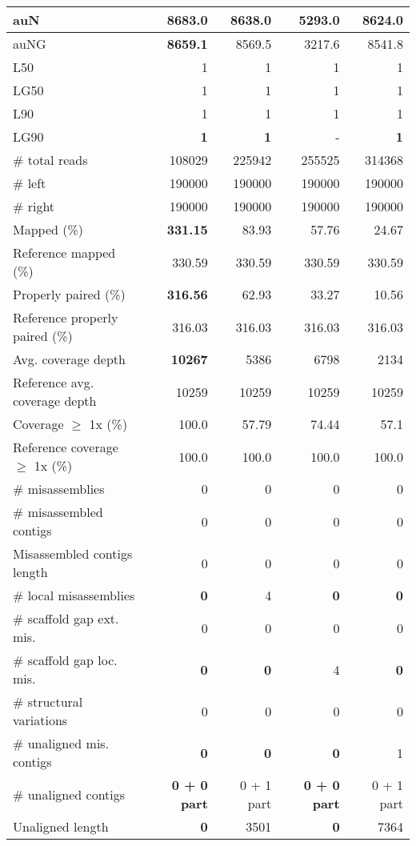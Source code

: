 \documentclass[12pt,a4paper]{article}
\begin{document}
\begin{table}[ht]
\begin{center}
\begin{tabular}{|l*{4}{|r}|}
auN & {\bf 8683.0} & 8638.0 & 5293.0 & 8624.0 \\ \hline
auNG & {\bf 8659.1} & 8569.5 & 3217.6 & 8541.8 \\ \hline
L50 & 1 & 1 & 1 & 1 \\ \hline
LG50 & 1 & 1 & 1 & 1 \\ \hline
L90 & 1 & 1 & 1 & 1 \\ \hline
LG90 & {\bf 1} & {\bf 1} & - & {\bf 1} \\ \hline
\# total reads & 108029 & 225942 & 255525 & 314368 \\ \hline
\# left & 190000 & 190000 & 190000 & 190000 \\ \hline
\# right & 190000 & 190000 & 190000 & 190000 \\ \hline
Mapped (\%) & {\bf 331.15} & 83.93 & 57.76 & 24.67 \\ \hline
Reference mapped (\%) & 330.59 & 330.59 & 330.59 & 330.59 \\ \hline
Properly paired (\%) & {\bf 316.56} & 62.93 & 33.27 & 10.56 \\ \hline
Reference properly paired (\%) & 316.03 & 316.03 & 316.03 & 316.03 \\ \hline
Avg. coverage depth & {\bf 10267} & 5386 & 6798 & 2134 \\ \hline
Reference avg. coverage depth & 10259 & 10259 & 10259 & 10259 \\ \hline
Coverage $\geq$ 1x (\%) & 100.0 & 57.79 & 74.44 & 57.1 \\ \hline
Reference coverage $\geq$ 1x (\%) & 100.0 & 100.0 & 100.0 & 100.0 \\ \hline
\# misassemblies & 0 & 0 & 0 & 0 \\ \hline
\# misassembled contigs & 0 & 0 & 0 & 0 \\ \hline
Misassembled contigs length & 0 & 0 & 0 & 0 \\ \hline
\# local misassemblies & {\bf 0} & 4 & {\bf 0} & {\bf 0} \\ \hline
\# scaffold gap ext. mis. & 0 & 0 & 0 & 0 \\ \hline
\# scaffold gap loc. mis. & {\bf 0} & {\bf 0} & 4 & {\bf 0} \\ \hline
\# structural variations & 0 & 0 & 0 & 0 \\ \hline
\# unaligned mis. contigs & {\bf 0} & {\bf 0} & {\bf 0} & 1 \\ \hline
\# unaligned contigs & {\bf 0 + 0 part} & 0 + 1 part & {\bf 0 + 0 part} & 0 + 1 part \\ \hline
Unaligned length & {\bf 0} & 3501 & {\bf 0} & 7364 \\ \hline

\end{tabular}
\end{center}
\end{table}
\end{document}
